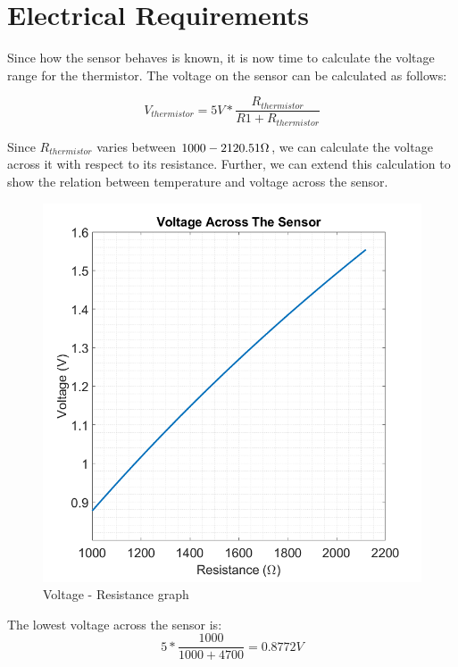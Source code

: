 \section*{Electrical Requirements}
Since how the sensor behaves is known, it is now time to calculate the voltage range for the thermistor. The voltage on the sensor can be calculated as follows:

\begin{equation}
    V_{thermistor} = 5V * \frac{R_{thermistor}}{R1 + R_{thermistor}}
\end{equation}

Since $R_{thermistor}$ varies between $1000 - 2120.51 \ohm$, we can calculate the voltage across it with respect to its resistance. Further, we can extend this calculation to show the relation between temperature and voltage across the sensor.

\begin{figure}[H]
    \centering
    \includegraphics[scale=0.45]{pics/ptc_res_volt}
    \caption{Voltage - Resistance graph}
\end{figure}

The lowest voltage across the sensor is:
\begin{equation}
    5*\frac{1000}{1000+4700}= 0.8772 V
\end{equation}

